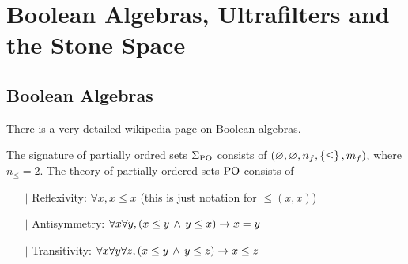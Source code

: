 \section{Boolean Algebras, Ultrafilters and the Stone Space}
\subsection{Boolean Algebras}
There is a very detailed wikipedia page \cite{wiki0} on Boolean algebras.

\begin{dfn}
    The signature of partially ordred sets $\Sigma_{\mathrm{PO}}$ consists of 
    $(\varnothing,\varnothing ,n_f,\left\{\leq\right\},m_f)$,
    where $n_\leq = 2$.
    The theory of partially ordered sets $\mathrm{PO}$ consists of 
    \begin{itemize}
        \item[$\vert$] Reflexivity: 
            $\forall x, 
            x \leq x$ (this is just notation for $\leq(x,x)$)
        \item[$\vert$] Antisymmetry: 
            $\forall x \forall y, 
            (x \leq y \, \land \, y \leq x) \to x = y$
        \item[$\vert$] Transitivity:
            $\forall x \forall y \forall z, 
            (x \leq y \, \land \, y \leq z) \to x \leq z$
    \end{itemize}
\end{dfn}


